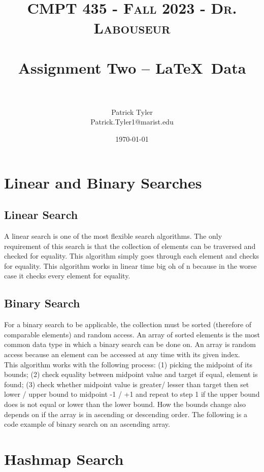 \documentclass[letterpaper, 10pt]{article}
\title{	
   \normalfont \normalsize 
   \textsc{CMPT 435 - Fall 2023 - Dr. Labouseur} \\[10pt] %
   \horrule{0.5pt} \\[0.25cm] 	%
   \huge Assignment Two -- \LaTeX ~Data\\     	    %
   \horrule{0.5pt} \\[0.25cm] 	%
}
\author{Patrick Tyler \\ \normalsize Patrick.Tyler1@marist.edu}
\date{\normalsize\today} 	%
\begin{document}
\maketitle %


\section{Linear and Binary Searches}
\subsection{Linear Search}
A linear search is one of the most flexible search algorithms. The only requirement of this search is that
the collection of elements can be traversed and checked for equality. This algorithm simply goes through
each element and checks for equality. This algorithm works in linear time big oh of n because in the worse
case it checks every element for equality.
\subsection{Binary Search}
For a binary search to be applicable, the collection must be sorted (therefore of comparable elements)
and random access. An array of sorted elements is the most common data type in which a binary search
can be done on. An array is random access because an element can be accessed at any time with its
given index.\\
\newline
This algorithm works with the following process: (1) picking the midpoint of its bounds;
(2) check equality between midpoint value and target if equal, element is found;
(3) check whether midpoint value is greater/ lesser than target then set lower / upper bound to
midpoint -1 / +1 and repeat to step 1 if the upper bound does is not equal or lower than the lower bound. 
How the bounds change also depends on if the array is in ascending or descending order.
The following is a code example of binary search on an ascending array.
\section{Hashmap Search}
\end{document}
